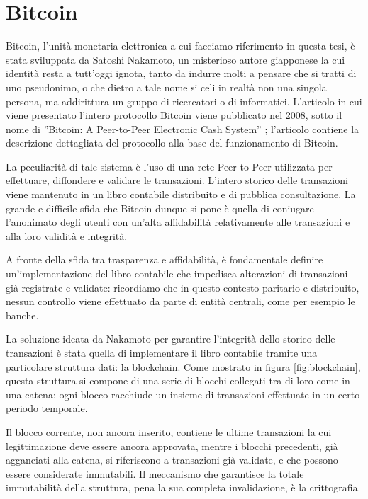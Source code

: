 \section{Bitcoin}
Bitcoin, l’unità monetaria elettronica a cui facciamo riferimento in questa tesi, è stata sviluppata da Satoshi Nakamoto, un misterioso autore giapponese la cui identità resta a tutt'oggi ignota, tanto da indurre molti a pensare che si tratti di uno pseudonimo, o che dietro a tale nome si celi in realtà non una singola persona, ma addirittura un gruppo di ricercatori o di informatici. L’articolo in cui viene presentato l’intero protocollo Bitcoin viene pubblicato nel 2008, sotto il nome di ”Bitcoin: A Peer-to-Peer Electronic Cash System” \cite{nakamoto2008bitcoin}; l'articolo contiene la descrizione dettagliata del protocollo alla base del funzionamento di Bitcoin.

La peculiarità di tale sistema è l’uso di una rete Peer-to-Peer utilizzata per effettuare, diffondere e validare le transazioni. L’intero storico delle transazioni viene mantenuto in un libro contabile distribuito e di pubblica consultazione. La grande e difficile sfida che Bitcoin dunque si pone è quella di coniugare l’anonimato degli utenti con un’alta affidabilità relativamente alle transazioni e alla loro validità e integrità.

A fronte della sfida tra trasparenza e affidabilità, è fondamentale definire un’implementazione del libro contabile che impedisca alterazioni di transazioni già registrate e validate: ricordiamo che in questo contesto paritario e distribuito, nessun controllo viene effettuato da parte di entità centrali, come per esempio le banche.


La soluzione ideata da Nakamoto per garantire l’integrità dello storico delle transazioni è stata quella di implementare il libro contabile tramite una particolare struttura dati: la blockchain. Come mostrato in figura \ref{fig:blockchain}, questa struttura si compone di una serie di blocchi collegati tra di loro come in una catena: ogni blocco racchiude un insieme di transazioni effettuate in un certo periodo temporale.

Il blocco corrente, non ancora inserito, contiene le ultime transazioni la cui legittimazione deve essere ancora approvata, mentre i blocchi precedenti, già agganciati alla catena, si riferiscono a transazioni già validate, e che possono essere considerate immutabili. Il meccanismo che garantisce la totale immutabilità della struttura, pena la sua completa invalidazione, è la crittografia.

